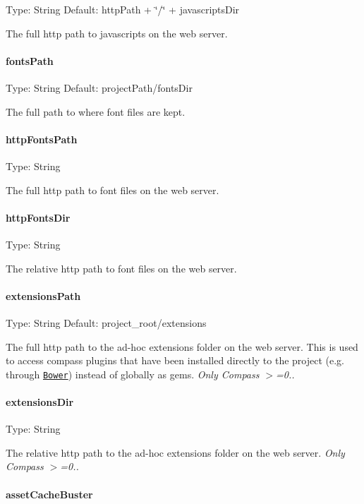 Type\+: {\ttfamily String} Default\+: {\ttfamily http\+Path + \char`\"{}/\char`\"{} + javascripts\+Dir}

The full http path to javascripts on the web server.

\paragraph*{fonts\+Path}

Type\+: {\ttfamily String} Default\+: {\ttfamily project\+Path/fonts\+Dir}

The full path to where font files are kept.

\paragraph*{http\+Fonts\+Path}

Type\+: {\ttfamily String}

The full http path to font files on the web server.

\paragraph*{http\+Fonts\+Dir}

Type\+: {\ttfamily String}

The relative http path to font files on the web server.

\paragraph*{extensions\+Path}

Type\+: {\ttfamily String} Default\+: {\ttfamily project\+\_\+root/extensions}

The full http path to the ad-\/hoc extensions folder on the web server. This is used to access compass plugins that have been installed directly to the project (e.\+g. through \href{https://github.com/bower/bower}{\tt Bower}) instead of globally as gems. {\itshape Only Compass $>$=0..}

\paragraph*{extensions\+Dir}

Type\+: {\ttfamily String}

The relative http path to the ad-\/hoc extensions folder on the web server. {\itshape Only Compass $>$=0..}

\paragraph*{asset\+Cache\+Buster}

